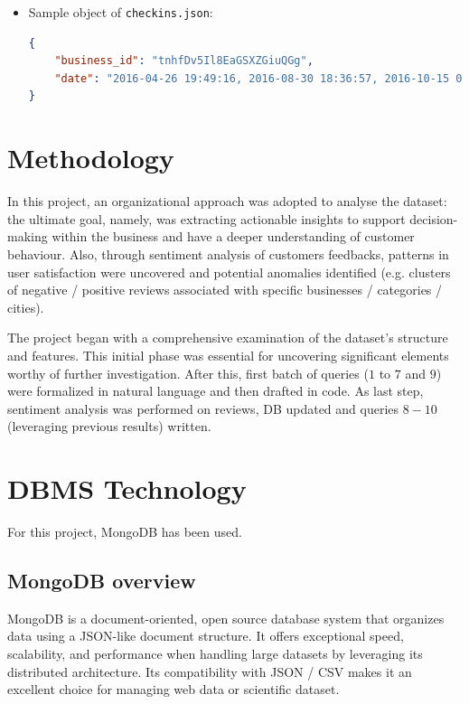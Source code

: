 \documentclass{Configuration_Files/PoliMi3i_thesis}
\begin{document}
\begin{itemize}
\bigskip

\item Sample object of \texttt{checkins.json}:
\bigskip
\begin{lstlisting}[language=json]
{
    "business_id": "tnhfDv5Il8EaGSXZGiuQGg",
    "date": "2016-04-26 19:49:16, 2016-08-30 18:36:57, 2016-10-15 02:45:18, 2016-11-18 01:54:50, 2017-04-20 18:39:06, 2017-05-03 17:58:02"
}
\end{lstlisting}

\end{itemize}

\section{Methodology}
In this project, an organizational approach was adopted to analyse the dataset: the ultimate goal, namely, was extracting actionable insights to support decision-making within the business and have a deeper understanding of customer behaviour. Also, through sentiment analysis of customers feedbacks, patterns in user satisfaction were uncovered and potential anomalies identified (e.g. clusters of negative / positive reviews associated with specific businesses / categories / cities).

The project began with a comprehensive examination of the dataset’s structure and features. This initial phase was essential for uncovering significant elements worthy of further investigation. After this, first batch of queries ($1$ to $7$ and $9$) were formalized in natural language and then drafted in code. As last step, sentiment analysis was performed on reviews, DB updated and queries $8 - 10$ (leveraging previous results) written.  

\section{DBMS Technology}
For this project, MongoDB has been used.

\subsection{MongoDB overview}
MongoDB is a document-oriented, open source database system that organizes data using a JSON-like document structure. It offers exceptional speed, scalability, and performance when handling large datasets by leveraging its distributed architecture. Its compatibility with JSON / CSV makes it an excellent choice for managing web data or scientific dataset.
\end{document}
